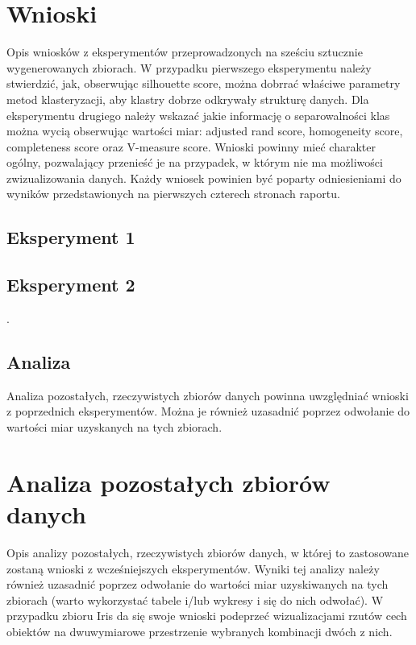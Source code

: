 \documentclass[12pt]{article}
\begin{document}
\section{Wnioski}
Opis wniosków z eksperymentów przeprowadzonych na sześciu sztucznie wygenerowanych zbiorach. W przypadku pierwszego eksperymentu należy stwierdzić, jak, obserwując silhouette score, można dobrrać właściwe parametry metod klasteryzacji, aby klastry dobrze odkrywały strukturę danych. Dla eksperymentu drugiego należy wskazać jakie informację o separowalności klas można wycią obserwując wartości miar: adjusted rand score, homogeneity score,  completeness score oraz V-measure score. Wnioski powinny mieć charakter ogólny, pozwalający przenieść je na przypadek, w którym nie ma możliwości zwizualizowania danych. Każdy wniosek powinien być poparty odniesieniami do wyników przedstawionych na pierwszych czterech stronach raportu.

\subsection*{Eksperyment 1}



\subsection*{Eksperyment 2}

.

\subsection*{Analiza}

Analiza pozostałych, rzeczywistych zbiorów danych powinna uwzględniać wnioski z poprzednich eksperymentów. Można je również uzasadnić poprzez odwołanie do wartości miar uzyskanych na tych zbiorach.


\newpage
\section{Analiza pozostałych zbiorów danych}
Opis analizy pozostałych, rzeczywistych zbiorów danych, w której to zastosowane zostaną wnioski z wcześniejszych eksperymentów. Wyniki tej analizy należy również uzasadnić poprzez odwołanie do wartości miar uzyskiwanych na tych zbiorach (warto wykorzystać tabele i/lub wykresy i się do nich odwołać). W przypadku zbioru Iris da się swoje wnioski podeprzeć wizualizacjami rzutów cech obiektów na dwuwymiarowe przestrzenie wybranych kombinacji dwóch z nich.
\end{document}
